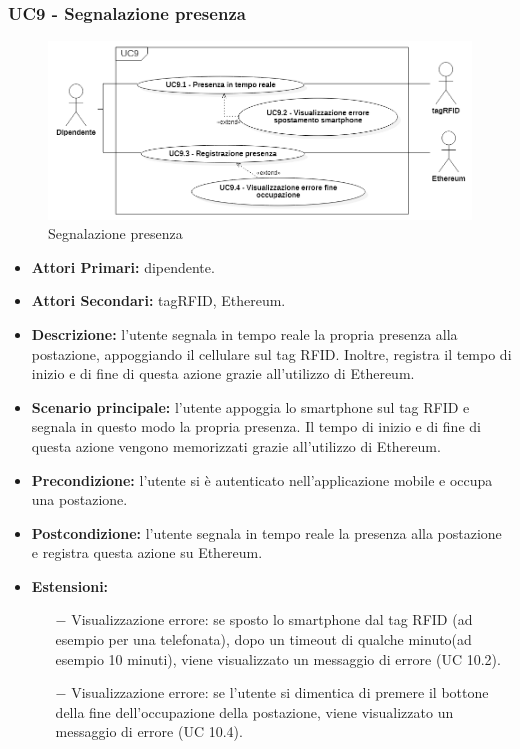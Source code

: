 \subsubsection{ UC9 - Segnalazione presenza}
\begin{figure}[H]
	\centering
	\includegraphics[width=15cm]{res/images/UC9.png}
	\caption{Segnalazione presenza}
	\label{fig:Segnalazione presenza}
\end{figure}
\begin{itemize}
           	\item\textbf{Attori Primari:} dipendente.
           	\item\textbf{Attori Secondari:} tagRFID, Ethereum.
           	\item\textbf{Descrizione:} l’utente segnala in tempo reale la propria presenza alla postazione, appoggiando il cellulare sul tag RFID. Inoltre, registra il tempo di inizio e di fine di questa azione grazie all'utilizzo di Ethereum.
           	\item\textbf{Scenario principale:} l’utente appoggia lo smartphone sul tag RFID e segnala in questo modo la propria presenza.
           	Il tempo di inizio e di fine di questa azione vengono memorizzati grazie all'utilizzo di Ethereum.
           	\item\textbf{Precondizione:} l’utente si è autenticato nell'applicazione mobile e occupa una postazione.
           	\item\textbf{Postcondizione:} l’utente segnala in tempo reale la presenza alla postazione e registra questa azione su Ethereum.
           	\item\textbf{Estensioni:} 
           	\begin{itemize}
           		\item[$-$] Visualizzazione errore: se sposto lo smartphone dal tag RFID (ad esempio per una telefonata), 
           		dopo un timeout di qualche minuto(ad esempio 10 minuti), viene visualizzato un messaggio di errore (UC 10.2).
           		\item[$-$] Visualizzazione errore: se l'utente si dimentica di premere il bottone della fine dell'occupazione della postazione,
           		viene visualizzato un messaggio di errore (UC 10.4).
           	\end{itemize}
\end{itemize}

